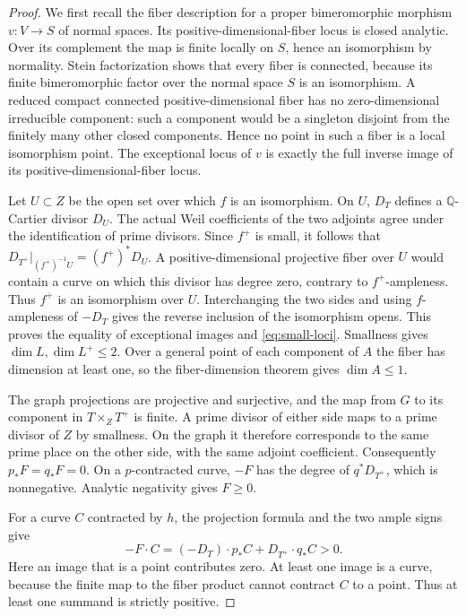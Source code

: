 \documentclass[11pt]{amsart}
\theoremstyle{definition}
\theoremstyle{remark}
\numberwithin{equation}{section}
\newcommand{\Q}{\mathbb{Q}}
\begin{document}
\begin{proof}
We first recall the fiber description for a proper bimeromorphic
morphism $v:V\to S$ of normal spaces.  Its positive-dimensional-fiber
locus is closed analytic.  Over its complement the map is finite
locally on $S$, hence an isomorphism by normality.  Stein factorization
shows that every fiber is connected, because its finite bimeromorphic
factor over the normal space $S$ is an isomorphism.  A reduced compact
connected positive-dimensional fiber has no zero-dimensional
irreducible component: such a component would be a singleton disjoint
from the finitely many other closed components.  Hence no point in
such a fiber is a local isomorphism point.  The exceptional locus of
$v$ is exactly the full inverse image of its positive-dimensional-fiber
locus.

Let $U\subset Z$ be the open set over which $f$ is an isomorphism.
On $U$, $D_T$ defines a $\Q$-Cartier divisor $D_U$.  The actual Weil
coefficients of the two adjoints agree under the identification of
prime divisors.  Since $f^+$ is small, it follows that
$D_{T^+}|_{(f^+)^{-1}U}=(f^+)^*D_U$.  A positive-dimensional projective
fiber over $U$ would contain a curve on which this divisor has degree
zero, contrary to $f^+$-ampleness.  Thus $f^+$ is an isomorphism over
$U$.  Interchanging the two sides and using $f$-ampleness of $-D_T$
gives the reverse inclusion of the isomorphism opens.  This proves
the equality of exceptional images and \eqref{eq:small-loci}.
Smallness gives $\dim L,\dim L^+\leq2$.  Over a general point of each
component of $A$ the fiber has dimension at least one, so the
fiber-dimension theorem gives $\dim A\leq1$.

The graph projections are projective and surjective, and the map from
$G$ to its component in $T\times_ZT^+$ is finite.  A prime divisor of
either side maps to a prime divisor of $Z$ by smallness.  On the graph
it therefore corresponds to the same prime place on the other side,
with the same adjoint coefficient.  Consequently $p_*F=q_*F=0$.
On a $p$-contracted curve, $-F$ has the degree of $q^*D_{T^+}$, which
is nonnegative.  Analytic negativity gives $F\geq0$.

For a curve $C$ contracted by $h$, the projection formula and the two
ample signs give
\[
 -F\cdot C=(-D_T)\cdot p_*C+D_{T^+}\cdot q_*C>0.
\]
Here an image that is a point contributes zero.  At least one image is
a curve, because the finite map to the fiber product cannot contract
$C$ to a point.  Thus at least one summand is strictly positive.


\end{proof}
\end{document}
